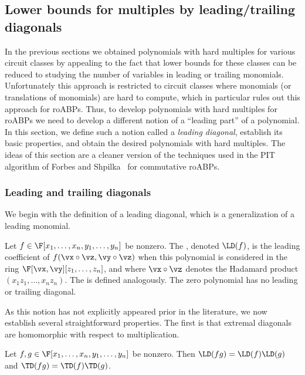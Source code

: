 \documentclass{toc}
\begin{document}
\subsection{Lower bounds for multiples by leading/trailing diagonals}

In the previous sections we obtained polynomials with hard multiples for various circuit classes by appealing to the fact that lower bounds for these classes can be reduced to studying the number of variables in leading or trailing monomials.  Unfortunately this approach is restricted to circuit classes where monomials (or translations of monomials) are hard to compute, which in particular rules out this approach for roABPs.  Thus, to develop polynomials with hard multiples for roABPs we need to develop a different notion of a ``leading part'' of a polynomial.  In this section, we define such a notion called a \emph{leading diagonal}, establish its basic properties, and obtain the desired polynomials with hard multiples.  The ideas of this section are a cleaner version of the techniques used in the PIT algorithm of Forbes and Shpilka~\cite{ForbesShpilka12} for commutative roABPs.

\subsubsection{Leading and trailing diagonals}

We begin with the definition of a leading diagonal, which is a generalization of a leading monomial.

\begin{definition}
        Let $f\in\F[x_1,\ldots,x_n,y_1,\ldots,y_n]$ be nonzero.  The , denoted $\LD(f)$, is the leading coefficient of $f(\vx\circ\vz,\vy\circ\vz)$ when this polynomial is considered in the ring $\F[\vx,\vy][z_1,\ldots,z_n]$, and where $\vx\circ\vz$ denotes the Hadamard product $(x_1z_1,\ldots,x_nz_n)$.  The  is defined analogously. The zero polynomial has no leading or trailing diagonal.
\end{definition}

As this notion has not explicitly appeared prior in the literature, we now establish several straightforward properties. The first is that extremal diagonals are homomorphic with respect to multiplication.

\begin{lemma}\label{res:diagonals:mult-hom}
        Let $f,g\in\F[x_1,\ldots,x_n,y_1,\ldots,y_n]$ be nonzero.  Then $\LD(fg)=\LD(f)\LD(g)$ and $\TD(fg)=\TD(f)\TD(g)$.
\end{lemma}
\end{document}
